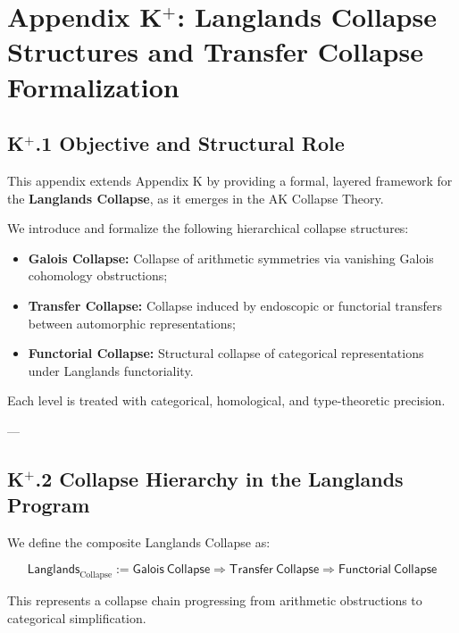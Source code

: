 \documentclass[11pt]{article}
\begin{document}

\section*{Appendix K$^{+}$: Langlands Collapse Structures and Transfer Collapse Formalization}

\subsection*{K$^{+}$.1 Objective and Structural Role}

This appendix extends Appendix K by providing a formal, layered framework for the \textbf{Langlands Collapse}, as it emerges in the AK Collapse Theory.

We introduce and formalize the following hierarchical collapse structures:

\begin{itemize}
    \item \textbf{Galois Collapse:} Collapse of arithmetic symmetries via vanishing Galois cohomology obstructions;
    \item \textbf{Transfer Collapse:} Collapse induced by endoscopic or functorial transfers between automorphic representations;
    \item \textbf{Functorial Collapse:} Structural collapse of categorical representations under Langlands functoriality.
\end{itemize}

Each level is treated with categorical, homological, and type-theoretic precision.

---

\subsection*{K$^{+}$.2 Collapse Hierarchy in the Langlands Program}

We define the composite Langlands Collapse as:

\[
\mathsf{Langlands}_{\text{Collapse}} := 
\mathsf{Galois\ Collapse} 
\Rightarrow \mathsf{Transfer\ Collapse} 
\Rightarrow \mathsf{Functorial\ Collapse}
\]

This represents a collapse chain progressing from arithmetic obstructions to categorical simplification.
\end{document}

